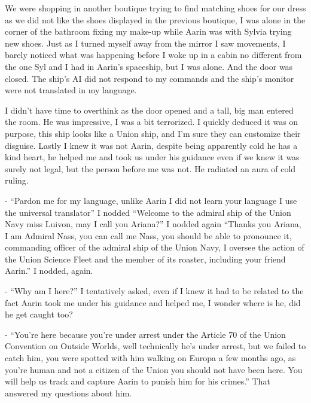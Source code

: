 \documentclass[colorlinks,12pt,a4paper]{book}
\begin{document}
We were shopping in another boutique trying to find matching shoes for our dress as we did not like the shoes displayed in 
the previous boutique, I was alone in the corner of the bathroom fixing my make-up while Aarin was with Sylvia trying new 
shoes. Just as I turned myself away from the mirror I saw movements, I barely noticed what was happening before I woke up 
in a cabin no different from the one Syl and I had in Aarin's spaceship, but I was alone. And the door was closed. 
The ship's AI did not respond to my commands and the ship's monitor were not translated in my language.\par
\bigskip

I didn't have time to overthink as the door opened and a tall, big man entered the room. He was impressive, 
I was a bit terrorized. I quickly deduced it was on purpose, this ship looks like a Union ship, and I'm sure they 
can customize their disguise. Lastly I knew it was not Aarin, despite being apparently cold he has a kind heart, 
he helped me and took us under his guidance even if we knew it was surely not legal, but the person before me was not. 
He radiated an aura of cold ruling.\par
\bigskip

- “Pardon me for my language, unlike Aarin I did not learn your language I use the universal translator” I nodded 
“Welcome to the admiral ship of the Union Navy miss Luivon, may I call you Ariana?” I nodded again “Thanks you Ariana, 
I am Admiral Nass, you can call me Nass, you should be able to pronounce it, commanding officer of the admiral ship of 
the Union Navy, I oversee the action of the Union Science Fleet and the member of its roaster, including your friend Aarin.” 
I nodded, again.\par
\bigskip

- “Why am I here?” I tentatively asked, even if I knew it had to be related to the fact Aarin took me under his guidance 
and helped me, I wonder where is he, did he get caught too?\par
\bigskip

- “You're here because you're under arrest under the Article 70 of the Union Convention on Outside Worlds, well 
technically he's under arrest, but we failed to catch him, you were spotted with him walking on Europa a few months ago, 
as you're human and not a citizen of the Union you should not have been here. You will help us track and capture Aarin 
to punish him for his crimes.” That answered my questions about him.\par
\bigskip
\end{document}
